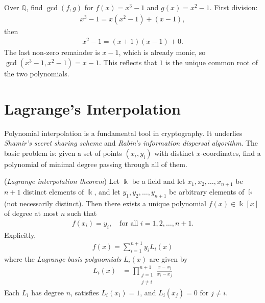 \documentclass[a4paper, 12pt]{book} %
\begin{document}
\begin{example}
    Over $\mathbb{Q}$, find $\gcd(f, g)$ for $f(x) = x^3 - 1$ and $g(x) = x^2 - 1$. First division:
    \begin{align}
        x^3 - 1 = x(x^2 - 1) + (x - 1),
    \end{align}
    then
    \begin{align}
        x^2 - 1 = (x + 1)(x - 1) + 0.
    \end{align}
    The last non-zero remainder is $x - 1$, which is already monic, so $\gcd(x^3 - 1, x^2 - 1) = x - 1$. This reflects that $1$ is the unique common root of the two polynomials.
\end{example}

\section{Lagrange's Interpolation}

Polynomial interpolation is a fundamental tool in cryptography. It underlies
\emph{Shamir's secret sharing scheme} and \emph{Rabin's information dispersal
algorithm}. The basic problem is: given a set of points $(x_i, y_i)$ with distinct
$x$-coordinates, find a polynomial of minimal degree passing through all of them.

\begin{theorem}
    (\emph{Lagrange interpolation theorem}) Let $\Bbbk$ be a field and let $x_1, x_2, \ldots, x_{n+1}$ be $n+1$ distinct elements of $\Bbbk$, and let $y_1, y_2, \ldots, y_{n+1}$ be arbitrary elements of $\Bbbk$ (not necessarily distinct). Then there exists a unique polynomial $f(x) \in \Bbbk[x]$ of degree at most $n$ such that
    \begin{align}
        f(x_i) = y_i, \quad \text{for all } i = 1, 2, \ldots, n+1.
    \end{align}
    Explicitly,
    \begin{align}
        f(x) = \sum_{i=1}^{n+1} y_i L_i(x)
    \end{align}
    where the \emph{Lagrange basis polynomials} $L_i(x)$ are given by
    \begin{align}
        L_i(x) &= \prod_{\substack{j = 1 \\ j \neq i}}^{n+1} \frac{x - x_j}{x_i - x_j}
    \end{align}
    Each $L_i$ has degree $n$, satisfies $L_i(x_i) = 1$, and $L_i(x_j) = 0$ for $j \neq i$.
\end{theorem}
\end{document}
